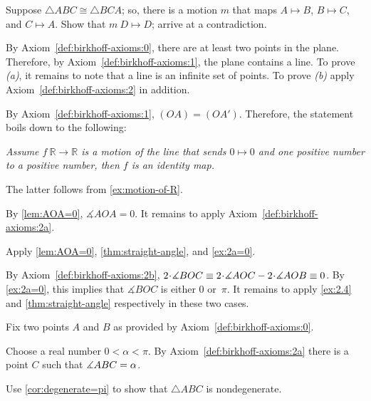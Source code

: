  Suppose $\triangle ABC\cong \triangle BCA$; so, there is a motion $m$ that maps $A\mapsto B$, $B\mapsto C$, and $C\mapsto A$.
Show that $m\:D\mapsto D$; arrive at a contradiction.


\setcounter{eqtn}{0}

 By Axiom~\ref{def:birkhoff-axioms:0}, there are at least two points in the plane.
Therefore, by Axiom~\ref{def:birkhoff-axioms:1}, 
the plane contains a line. 
To prove \textit{(a)}, it remains to note that a line is an infinite set of points.
To prove \textit{(b)} apply Axiom~\ref{def:birkhoff-axioms:2} in addition.

\parbf{\ref{ex:[OA)=[OA')}.}
By Axiom~\ref{def:birkhoff-axioms:1},
$(OA)=(OA')$.
Therefore, the statement boils down to the following:

\textit{Assume $f\:\mathbb{R}\to \mathbb{R}$ is a motion of the line that sends $0\mapsto 0$ and one positive number to a positive number, then $f$ is an identity map.}

The latter follows from \ref{ex:motion-of-R}.

By \ref{lem:AOA=0},
$\measuredangle AOA=0$.
It remains to apply Axiom~\ref{def:birkhoff-axioms:2a}.

Apply \ref{lem:AOA=0},
\ref{thm:straight-angle},
and \ref{ex:2a=0}.

By Axiom~\ref{def:birkhoff-axioms:2b},
$2\cdot\measuredangle BOC
\equiv 
2\cdot\measuredangle AOC\z-2\cdot \measuredangle AOB
\equiv 0$.
By \ref{ex:2a=0}, 
this implies that 
$\measuredangle BOC$ is either $0$ or~$\pi$.
It remains to apply \ref{ex:2.4} and \ref{thm:straight-angle} respectively in these two cases.

Fix two points $A$ and $B$ as provided by Axiom~\ref{def:birkhoff-axioms:0}.

Choose a real number $0<\alpha<\pi$.
By Axiom~\ref{def:birkhoff-axioms:2a} there is a point $C$ such that $\measuredangle ABC=\alpha$.

Use \ref{cor:degenerate=pi} to show that $\triangle ABC$ is nondegenerate.


